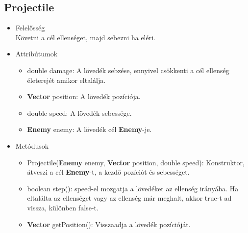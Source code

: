 \subsection{Projectile}
\begin{itemize}
\item Felelősség\\
Követni a cél ellenséget, majd sebezni ha eléri.
\item Attribútumok
	\begin{itemize}
		\item double damage: A lövedék sebzése, ennyivel csökkenti a cél ellenség életerejét amikor eltalálja.
		\item \textbf{Vector} position: A lövedék pozíciója.
		\item double speed: A lövedék sebessége.
		\item \textbf{Enemy} enemy: A lövedék cél \textbf{Enemy}-je.
	\end{itemize}
\item Metódusok
	\begin{itemize}
		\item Projectile(\textbf{Enemy} enemy, \textbf{Vector} position, double speed): Konstruktor, átveszi a cél \textbf{Enemy}-t, a kezdő pozíciót és sebességet.
		\item boolean step():  speed-el mozgatja a lövedéket az ellenség irányába. Ha eltalálta az ellenséget vagy az ellenség már meghalt, akkor true-t ad vissza, különben false-t.
		\item \textbf{Vector} getPosition(): Visszaadja a lövedék pozícióját.
	\end{itemize}
\end{itemize}


